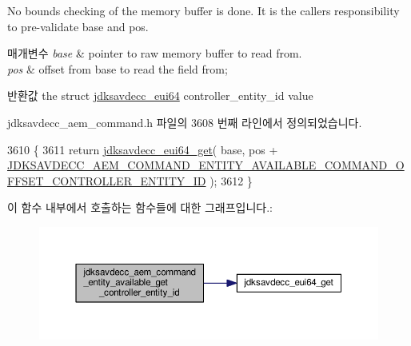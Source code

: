No bounds checking of the memory buffer is done. It is the caller\textquotesingle{}s responsibility to pre-\/validate base and pos.


\begin{DoxyParams}{매개변수}
{\em base} & pointer to raw memory buffer to read from. \\
\hline
{\em pos} & offset from base to read the field from; \\
\hline
\end{DoxyParams}
\begin{DoxyReturn}{반환값}
the struct \hyperlink{structjdksavdecc__eui64}{jdksavdecc\+\_\+eui64} controller\+\_\+entity\+\_\+id value 
\end{DoxyReturn}


jdksavdecc\+\_\+aem\+\_\+command.\+h 파일의 3608 번째 라인에서 정의되었습니다.


\begin{DoxyCode}
3610 \{
3611     \textcolor{keywordflow}{return} \hyperlink{group__eui64_ga2652311a25a6b91cddbed75c108c7031}{jdksavdecc\_eui64\_get}( base, pos + 
      \hyperlink{group__command__entity__available_ga964e8474e86735a78da5f889d44f0a71}{JDKSAVDECC\_AEM\_COMMAND\_ENTITY\_AVAILABLE\_COMMAND\_OFFSET\_CONTROLLER\_ENTITY\_ID}
       );
3612 \}
\end{DoxyCode}


이 함수 내부에서 호출하는 함수들에 대한 그래프입니다.\+:
\nopagebreak
\begin{figure}[H]
\begin{center}
\leavevmode
\includegraphics[width=350pt]{group__command__entity__available_ga18c696597b73276c8b9e73d0a0b7e74e_cgraph}
\end{center}
\end{figure}



